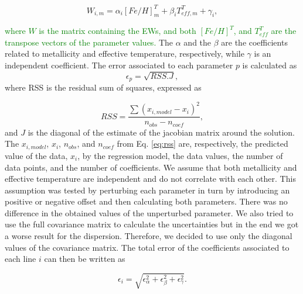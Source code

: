 \documentclass{aa}
\begin{document}
\begin{equation}
W_{i,m} = \alpha_{i}[Fe/H]_{m}^{T} + \beta_{i}T_{eff,m}^{T} + \gamma_{i}, %
\label{eq:fit}
\end{equation}

\textcolor{green}{where $W$ is the matrix containing the EWs, and both $[Fe/H]^{T}$, and $T_{eff}^{T}$ are the transpose vectors of the parameter values.} The $\alpha$ and the $\beta$ are the coefficients related to metallicity and effective temperature, respectively, while $\gamma$ is an independent coefficient. The error associated to each parameter $p$ is calculated as 
\begin{equation}
\label{eq:rss}
\epsilon_{p} = \sqrt{RSS.J},
\end{equation}
where RSS is the residual sum of squares, expressed as

\begin{equation}
RSS = \frac{\sum{(x_{i,model}-x_{i})^{2}}}{n_{obs}-n_{coef}},
\end{equation}
and $J$ is the diagonal of the estimate of the jacobian matrix around the solution. %
The $x_{i,model}$, $x_{i}$, $n_{obs}$, and $n_{coef}$ from Eq. \ref{eq:rss} are, respectively, the predicted value of the data, $x_{i}$, by the regression model, the data values, the number of data points, and the number of coefficients. We assume that both metallicity and effective temperature are independent and do not correlate with each other. This assumption was tested by perturbing each parameter in turn by introducing an positive or negative offset and then calculating both parameters. There was no difference in the obtained values of the unperturbed parameter. We also tried to use the full covariance matrix to calculate the uncertainties but in the end we got a worse result for the dispersion. Therefore, we decided to use only the diagonal values of the covariance matrix. The total error of the coefficients associated to each line $i$ can then be written as

\begin{equation} 
\epsilon_{i} = \sqrt{\epsilon_{\alpha}^{2}+\epsilon_{\beta}^{2}+\epsilon_{\gamma}^{2}}.
\end{equation}
\end{document}
